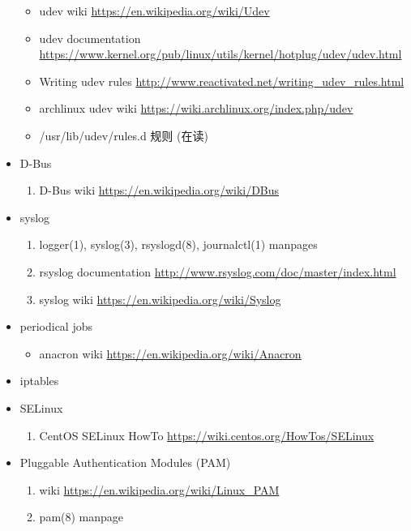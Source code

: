 \documentclass{article}
\begin{document}
\begin{itemize}
\begin{itemize}
            \item udev wiki \url{https://en.wikipedia.org/wiki/Udev}
            \item udev documentation \url{https://www.kernel.org/pub/linux/utils/kernel/hotplug/udev/udev.html}
            \item Writing udev rules \url{http://www.reactivated.net/writing_udev_rules.html}
            \item archlinux udev wiki \url{https://wiki.archlinux.org/index.php/udev}
            \item /usr/lib/udev/rules.d 规则 (在读)
        \end{itemize}
    \item D-Bus
        \begin{enumerate}
            \item D-Bus wiki \url{https://en.wikipedia.org/wiki/DBus}
        \end{enumerate}
    \item syslog
        \begin{enumerate}
            \item logger(1), syslog(3), rsyslogd(8), journalctl(1) manpages
            \item rsyslog documentation \url{http://www.rsyslog.com/doc/master/index.html}
            \item syslog wiki \url{https://en.wikipedia.org/wiki/Syslog}
        \end{enumerate}
    \item periodical jobs
        \begin{itemize}
            \item anacron wiki \url{https://en.wikipedia.org/wiki/Anacron}
        \end{itemize}
    \item iptables
        \begin{enumerate}
        \end{enumerate}
    \item SELinux
        \begin{enumerate}
            \item CentOS SELinux HowTo \url{https://wiki.centos.org/HowTos/SELinux}
        \end{enumerate}
    \item Pluggable Authentication Modules (PAM)
        \begin{enumerate}
            \item wiki \url{https://en.wikipedia.org/wiki/Linux_PAM}
            \item pam(8) manpage

\end{enumerate}
\end{itemize}
\end{document}
